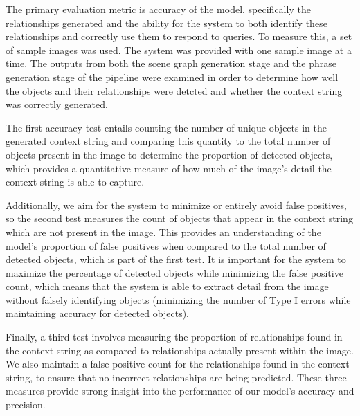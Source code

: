 \documentclass[letterpaper, 10 pt, conference]{ieeeconf}  %
\begin{document}
    The primary evaluation metric is accuracy of the model, specifically the relationships generated and the ability for the system to both identify these relationships and correctly use them to respond to queries. To measure this, a set of sample images was used. The system was provided with one sample image at a time. The outputs from both the scene graph generation stage and the phrase generation stage of the pipeline were  examined in order to determine how well the objects and their relationships were detcted and whether the context string was correctly generated. 
    
    The first accuracy test entails counting the number of unique objects in the generated context string and comparing this quantity to the total number of objects present in the image to determine the proportion of detected objects, which provides a quantitative measure of how much of the image's detail the context string is able to capture.
    
    Additionally, we aim for the system to minimize or entirely avoid false positives, so the second test measures the count of objects that appear in the context string which are not present in the image. This provides an understanding of the model's proportion of false positives when compared to the total number of detected objects, which is part of the first test. It is important for the system to maximize the percentage of detected objects while minimizing the false positive count, which means that the system is able to extract detail from the image without falsely identifying objects (minimizing the number of Type I errors while maintaining accuracy for detected objects). 
    
    Finally, a third test involves measuring the proportion of relationships found in the context string as compared to relationships actually present within the image. We also maintain a false positive count for the relationships found in the context string, to ensure that no incorrect relationships are being predicted. These three measures provide strong insight into the performance of our model's accuracy and precision.
\end{document}
